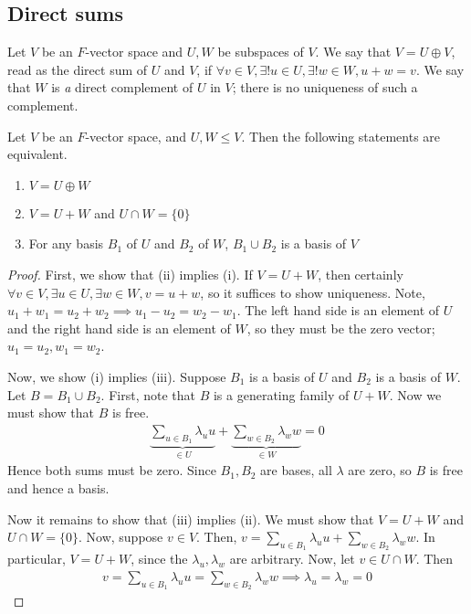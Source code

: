 \subsection{Direct sums}
\begin{definition}
    Let $V$ be an $F$-vector space and $U, W$ be subspaces of $V$.
    We say that $V = U \oplus V$, read as the direct sum of $U$ and $V$, if $\forall v \in V, \exists!
    u \in U, \exists!
    w \in W, u + w = v$.
    We say that $W$ is \textit{a} direct complement of $U$ in $V$; there is no uniqueness of such a complement.
\end{definition}
\begin{lemma}
    Let $V$ be an $F$-vector space, and $U, W \leq V$.
    Then the following statements are equivalent.
    \begin{enumerate}
        \item $V = U \oplus W$
        \item $V = U + W$ and $U \cap W = \{0\}$
        \item For any basis $B_1$ of $U$ and $B_2$ of $W$, $B_1 \cup B_2$ is a basis of $V$
    \end{enumerate}
\end{lemma}
\begin{proof}
    First, we show that (ii) implies (i).
    If $V = U + W$, then certainly $\forall v \in V, \exists u \in U, \exists w \in W, v = u + w$, so it suffices to show uniqueness.
    Note, $u_1 + w_1 = u_2 + w_2 \implies u_1 - u_2 = w_2 - w_1$.
    The left hand side is an element of $U$ and the right hand side is an element of $W$, so they must be the zero vector; $u_1 = u_2, w_1 = w_2$.

    Now, we show (i) implies (iii).
    Suppose $B_1$ is a basis of $U$ and $B_2$ is a basis of $W$.
    Let $B = B_1 \cup B_2$.
    First, note that $B$ is a generating family of $U + W$.
    Now we must show that $B$ is free.
    \begin{align*}
        \underbrace{\sum_{u \in B_1} \lambda_u u}_{\in U} + \underbrace{\sum_{w \in B_2} \lambda_w w}_{\in W} = 0
    \end{align*}
    Hence both sums must be zero.
    Since $B_1, B_2$ are bases, all $\lambda$ are zero, so $B$ is free and hence a basis.

    Now it remains to show that (iii) implies (ii).
    We must show that $V = U + W$ and $U \cap W = \{0\}$.
    Now, suppose $v \in V$.
    Then, $v = \sum_{u \in B_1} \lambda_u u + \sum_{w \in B_2} \lambda_w w$.
    In particular, $V = U + W$, since the $\lambda_u, \lambda_w$ are arbitrary.
    Now, let $v \in U \cap W$.
    Then
    \begin{align*}
        v = \sum_{u \in B_1} \lambda_u u = \sum_{w \in B_2} \lambda_w w \implies \lambda_u = \lambda_w = 0
    \end{align*}
\end{proof}

